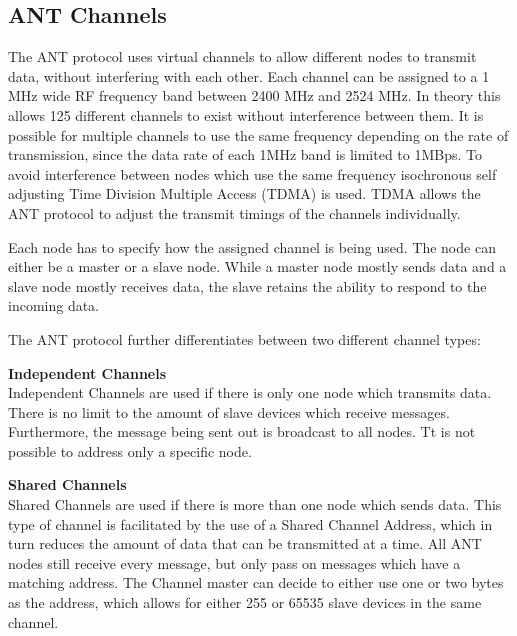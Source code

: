 \subsection{ANT Channels}
\label{sec:ANTchan}
The ANT protocol uses virtual channels to allow different nodes to transmit data, without interfering with each other. Each channel can be assigned to a 1 MHz wide RF frequency band between 2400 MHz and 2524 MHz.\cite{DynastreamInnovationsInc.2013} In theory this allows 125 different channels to exist without interference between them. It is possible for multiple channels to use the same frequency depending on the rate of transmission, since the data rate of each 1MHz band is limited to 1MBps. 
To avoid interference between nodes which use the same frequency isochronous self adjusting Time Division Multiple Access (TDMA) is used. TDMA allows the ANT protocol to adjust the transmit timings of the channels individually.

Each node has to specify how the assigned channel is being used. The node can either be a master or a slave node. While a master node mostly sends data and a slave node mostly receives data, the slave retains the ability to respond to the incoming data.

The ANT protocol further differentiates between two different channel types:
\begin{description}
	\item{\textbf{Independent Channels}} \hfill \\ Independent Channels are used if there is only one node which transmits data. There is no limit to the amount of slave devices which receive messages. Furthermore, the message being sent out is broadcast to all nodes. Tt is not possible to address only a specific node.
	\item{\textbf{Shared Channels}} \hfill \\ Shared Channels are used if there is more than one node which sends data. This type of channel is facilitated by the use of a Shared Channel Address, which in turn reduces the amount of data that can be transmitted at a time. All ANT nodes still receive every message, but only pass on messages which have a matching address. The Channel master can decide to either use one or two bytes as the address, which allows for either 255 or 65535 slave devices in the same channel. 
\end{description}

